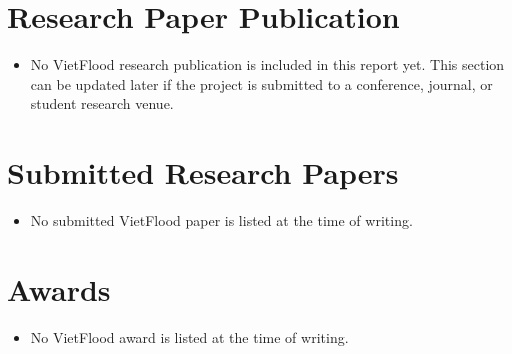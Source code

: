 
\section*{Research Paper Publication}
\begin{itemize}
    \item No VietFlood research publication is included in this report yet. This section can be updated later if the project is submitted to a conference, journal, or student research venue.
\end{itemize}

\section*{Submitted Research Papers}
\begin{itemize}
    \item No submitted VietFlood paper is listed at the time of writing.
\end{itemize}

\section*{Awards}
\begin{itemize}
    \item No VietFlood award is listed at the time of writing.
\end{itemize}
